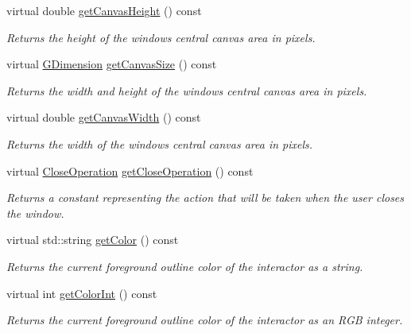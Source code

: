 \begin{DoxyCompactItemize}
virtual double \mbox{\hyperlink{classsgl_1_1GWindow_abd8bb28e2ac85d1b474db3f17f65115e}{get\+Canvas\+Height}} () const
\begin{DoxyCompactList}\small\item\em Returns the height of the window\textquotesingle{}s central canvas area in pixels. \end{DoxyCompactList}\item 
virtual \mbox{\hyperlink{structsgl_1_1GDimension}{G\+Dimension}} \mbox{\hyperlink{classsgl_1_1GWindow_a7d095192cefa2d9acf8fcf1cd00386c4}{get\+Canvas\+Size}} () const
\begin{DoxyCompactList}\small\item\em Returns the width and height of the window\textquotesingle{}s central canvas area in pixels. \end{DoxyCompactList}\item 
virtual double \mbox{\hyperlink{classsgl_1_1GWindow_a82ed6884fd4b0257a825e786236c2428}{get\+Canvas\+Width}} () const
\begin{DoxyCompactList}\small\item\em Returns the width of the window\textquotesingle{}s central canvas area in pixels. \end{DoxyCompactList}\item 
virtual \mbox{\hyperlink{classsgl_1_1GWindow_a84803201f0f9569db61f51cac9e0d2d2}{Close\+Operation}} \mbox{\hyperlink{classsgl_1_1GWindow_a733b18ceeceb7ab98da8c4ac9a8d2857}{get\+Close\+Operation}} () const
\begin{DoxyCompactList}\small\item\em Returns a constant representing the action that will be taken when the user closes the window. \end{DoxyCompactList}\item 
virtual std\+::string \mbox{\hyperlink{classsgl_1_1GDrawingSurface_aa061dfa488c31e18549d64363c1d0e34}{get\+Color}} () const
\begin{DoxyCompactList}\small\item\em Returns the current foreground outline color of the interactor as a string. \end{DoxyCompactList}\item 
virtual int \mbox{\hyperlink{classsgl_1_1GDrawingSurface_a9635c7af766cdc3417f346683fa0e6c1}{get\+Color\+Int}} () const
\begin{DoxyCompactList}\small\item\em Returns the current foreground outline color of the interactor as an R\+GB integer. \end{DoxyCompactList}\item 

\end{DoxyCompactItemize}
